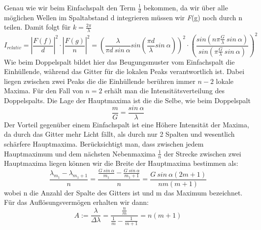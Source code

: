 \documentclass[]{article}
\begin{document}
Genau wie wir beim Einfachspalt den Term $\frac{1}{d}$ bekommen, da wir über alle möglichen Wellen im Spaltabstand d integrieren müssen wir \textit{F}(g) noch durch n teilen. 
Damit folgt für $k=\frac{2\pi}{\lambda}$
\begin{equation}
	I_{relativ}=\left|\frac{F(f) }{d}\right|^2\cdot\left|\frac{F(g)}{n}\right|^2=\left(\frac{\lambda}{\pi d \ sin \ \alpha}sin \left(\frac{\pi d}{\lambda}sin \ \alpha\right)\right)^2\cdot\left(\frac{sin \left(n \pi \frac{G}{\lambda} \ sin \ \alpha \right)}{sin \left(\pi \frac{G}{\lambda} \ sin \ \alpha\right)}\right)^2
\end{equation}
Wie beim Doppelspalt bildet hier das Beugungsmuster vom Einfachspalt die Einhüllende, während das Gitter für die lokalen Peaks verantwortlich ist. Dabei liegen zwischen zwei Peaks die die Einhüllende berühren immer $n-2$ lokale Maxima. Für den Fall von $n=2$ erhält man die Intensitätsverteilung des Doppelspalts. Die Lage der Hauptmaxima ist die die Selbe, wie beim Doppelspalt
\begin{equation}
	\frac{m}{G}=\frac{sin \ \alpha}{\lambda}
\end{equation}
Der Vorteil gegenüber einem Einfachspalt ist eine Höhere Intensität der Maxima, da durch das Gitter mehr Licht fällt, als durch nur 2 Spalten und wesentlich schärfere Hauptmaxima. Berücksichtigt man, dass zwischen jedem Hauptmaximum und dem nächsten Nebenmaxima $\frac{1}{n}$ der Strecke zwischen zwei Hauptmaxima liegen können wir die Breite der Hauptmaxima bestimmen als:
\begin{equation}
	\frac{\lambda_{m_1} - \lambda_{m_1+1}}{n}=\frac{\frac{G \ sin \ \alpha }{m_1} - \frac{G \ sin \ \alpha }{m_1+1}}{n}=\frac{G \ sin \ \alpha (2m+1)}{n m (m+1)}
\end{equation}
wobei n die Anzahl der Spalte des Gitters ist und m das Maximum bezeichnet.
Für das Auflösungsvermögen erhalten wir dann:
\begin{equation}\label{eq:Auflosungsvermogen_Gitter}
	A:=\frac{\lambda}{\Delta \lambda}=\frac{\frac{n}{m}}{\frac{1}{m}-\frac{1}{m+1}}=n(m+1)
\end{equation}
\end{document}
